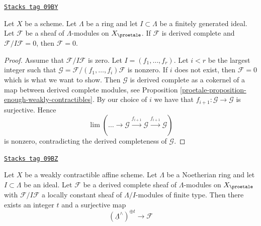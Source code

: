 \begin{lemma}
\label{proetale-lemma-derived-complete-zero}
\href{https://stacks.math.columbia.edu/tag/09BY}{\texttt{Stacks tag 09BY}}

Let $X$ be a scheme. Let $\Lambda$ be a ring and let
$I \subset \Lambda$ be a finitely generated ideal.
Let $\mathcal{F}$ be a sheaf of $\Lambda$-modules on $X_\proetale$.
If $\mathcal{F}$ is derived complete and $\mathcal{F}/I\mathcal{F} = 0$,
then $\mathcal{F} = 0$.
\end{lemma}

\begin{proof}

Assume that $\mathcal{F}/I\mathcal{F}$ is zero.
Let $I = (f_1, \ldots, f_r)$. Let $i < r$ be the largest
integer such that $\mathcal{G} = \mathcal{F}/(f_1, \ldots, f_i)\mathcal{F}$
is nonzero. If $i$ does not exist, then $\mathcal{F} = 0$ which is what we
want to show. Then $\mathcal{G}$ is derived complete as a cokernel
of a map between derived complete modules, see
Proposition \ref{proetale-proposition-enough-weakly-contractibles}.
By our choice of $i$ we have that $f_{i + 1} : \mathcal{G} \to \mathcal{G}$
is surjective. Hence
$$
\lim (\ldots \to \mathcal{G} \xrightarrow{f_{i + 1}} \mathcal{G}
\xrightarrow{f_{i + 1}} \mathcal{G})
$$
is nonzero, contradicting the derived completeness of $\mathcal{G}$.
\end{proof}

\begin{lemma}
\label{proetale-lemma-derived-complete-limit}
\href{https://stacks.math.columbia.edu/tag/09BZ}{\texttt{Stacks tag 09BZ}}

Let $X$ be a weakly contractible affine scheme.
Let $\Lambda$ be a Noetherian ring and let $I \subset \Lambda$ be an ideal.
Let $\mathcal{F}$ be a derived complete sheaf of $\Lambda$-modules
on $X_\proetale$ with $\mathcal{F}/I\mathcal{F}$ a locally
constant sheaf of $\Lambda/I$-modules of finite type.
Then there exists an integer $t$ and a surjective map
$$
(\underline{\Lambda}^\wedge)^{\oplus t} \to \mathcal{F}
$$
\end{lemma}

